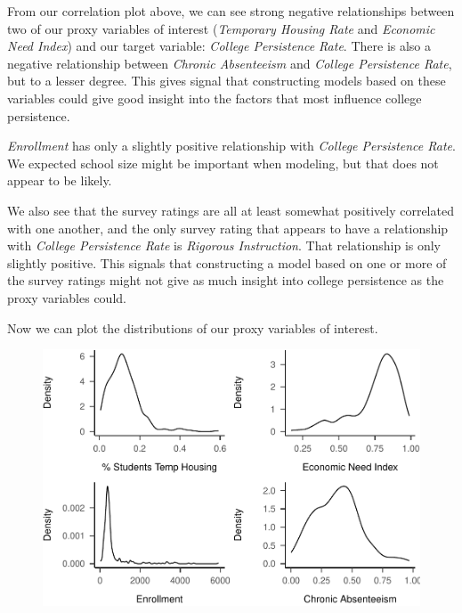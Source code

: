 \documentclass[
  man,floatsintext]{apa6}
\begin{document}
From our correlation plot above, we can see strong negative relationships between two of our proxy variables of interest (\emph{Temporary Housing Rate} and \emph{Economic Need Index}) and our target variable: \emph{College Persistence Rate}. There is also a negative relationship between \emph{Chronic Absenteeism} and \emph{College Persistence Rate}, but to a lesser degree. This gives signal that constructing models based on these variables could give good insight into the factors that most influence college persistence.

\emph{Enrollment} has only a slightly positive relationship with \emph{College Persistence Rate}. We expected school size might be important when modeling, but that does not appear to be likely.

We also see that the survey ratings are all at least somewhat positively correlated with one another, and the only survey rating that appears to have a relationship with \emph{College Persistence Rate} is \emph{Rigorous Instruction}. That relationship is only slightly positive. This signals that constructing a model based on one or more of the survey ratings might not give as much insight into college persistence as the proxy variables could.

Now we can plot the distributions of our proxy variables of interest.

\begin{figure}[H]
\includegraphics[width=\textwidth]{final-project_files/figure-latex/temp-housing-rates-1} \caption{ }\label{fig:temp-housing-rates}
\end{figure}
\end{document}

